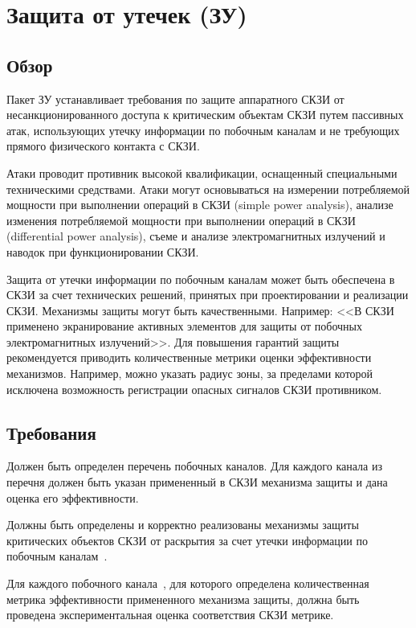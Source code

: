 \section{Защита от утечек (ЗУ)}\label{NI}

\subsection{Обзор}\label{NI.Intro}

Пакет ЗУ устанавливает требования по защите аппаратного СКЗИ от несанкционированного 
доступа к критическим объектам СКЗИ путем пассивных атак, использующих утечку 
информации по побочным каналам и не требующих прямого физического контакта с 
СКЗИ. 

Атаки проводит противник высокой квалификации, оснащенный специальными
техническими средствами. Атаки могут основываться на измерении потребляемой 
мощности при выполнении операций в СКЗИ (simple power analysis), анализе 
изменения потребляемой мощности при выполнении операций в СКЗИ (differential 
power analysis), съеме и анализе электромагнитных излучений и наводок при 
функционировании СКЗИ.

Защита от утечки информации по побочным каналам может быть обеспечена в СКЗИ за 
счет технических решений, принятых при проектировании и реализации СКЗИ. 
%
Механизмы защиты могут быть качественными. Например: 
<<В СКЗИ применено экранирование активных элементов для защиты от побочных 
электромагнитных излучений>>. 
%
Для повышения гарантий защиты рекомендуется приводить количественные метрики 
оценки эффективности механизмов. Например, можно указать радиус зоны, 
за пределами которой исключена возможность регистрации опасных сигналов 
СКЗИ противником.

\subsection{Требования}\label{NI.Reqs}


\label{R.NI.Channels}
Должен быть определен перечень побочных каналов. Для каждого канала из перечня
должен быть указан примененный в СКЗИ механизма защиты и дана оценка его
эффективности.
                             	

\label{R.NI.Protect}
Должны быть определены и корректно реализованы механизмы защиты критических 
объектов СКЗИ от раскрытия за счет утечки информации по побочным 
каналам~. 


\label{R.NI.Estimate}
Для каждого побочного канала~, для которого определена 
количественная метрика эффективности примененного механизма защиты, 
должна быть проведена экспериментальная оценка соответствия СКЗИ 
метрике.

